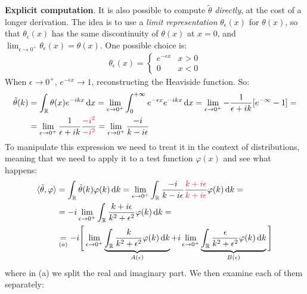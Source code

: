 \documentclass[../template.tex]{subfiles}
\begin{document}
\begin{expl}
    \textbf{Explicit computation}. It is also possible to compute $\tilde{\theta}$ \textit{directly}, at the cost of a longer derivation. The idea is to use a \textit{limit representation} $\theta_{\epsilon}(x)$ for $\theta(x)$, so that $\theta_{\epsilon}(x)$ has the same discontinuity of $\theta(x)$ at $x=0$, and $\lim_{\epsilon \to 0^+} \theta_{\epsilon}(x) = \theta(x)$. One possible choice is:
    \begin{align*}
        \theta_{\epsilon}(x) = \begin{cases}
            e^{-\epsilon x} & x > 0\\
            0 & x < 0
        \end{cases}
    \end{align*} 
    When $\epsilon \to 0^+$, $e^{-\epsilon x} \to 1$, reconstructing the Heaviside function. So:
    \begin{align*}
        \tilde{\theta}(k) &= \int_{\mathbb{R}} \theta(x) e^{-ikx} \dd{x} = \lim_{\epsilon \to 0^+} \int_0^{+\infty} e^{-\epsilon x} e^{-ikx} \dd{x} = \lim_{\epsilon \to 0^+} -\frac{1}{\epsilon + ik}[e^{-\infty} - 1] =\\
        &= \lim_{\epsilon \to 0^+} \frac{1}{\epsilon + ik} \frac{\textcolor{Red}{-i^2}}{\textcolor{Red}{-i^2}}   = \lim_{\epsilon \to 0^+} \frac{-i}{k- i \epsilon} 
    \end{align*}
    To manipulate this expression we need to treat it in the context of distributions, meaning that we need to apply it to a test function $\varphi(x)$ and see what happens:
    \begin{align*}
        \langle \tilde{\theta}, \varphi \rangle &= \int_{\mathbb{R}} \tilde{\theta}(k) \varphi(k) \dd{k} = \lim_{\epsilon \to 0^+} \int_{\mathbb{R}} \frac{-i}{k - i \epsilon} \frac{\textcolor{Red}{k+ i \epsilon}}{\textcolor{Red}{k + i \epsilon}}  \varphi(k) \dd{k} =\\
        &= -i \lim_{\epsilon \to 0^+} \int_{\mathbb{R}} \frac{k + i \epsilon}{k^2 + \epsilon^2} \varphi(k) \dd{k} =\\
        &\underset{(a)}{=} -i \Bigg[\lim_{\epsilon \to 0^+} \underbrace{\int_{\mathbb{R}} \frac{k}{k^2 + \epsilon^2} \varphi(k) \dd{k}}_{A(\epsilon)} + i \lim_{\epsilon \to 0^+} \underbrace{\int_{\mathbb{R}} \frac{\epsilon}{k^2 + \epsilon^2} \varphi(k) \dd{k}  }_{B(\epsilon)}\Bigg]
    \end{align*}
    where in (a) we split the real and imaginary part. We then examine each of them separately:
    \begin{align*}

\end{align*}
\end{expl}
\end{document}
